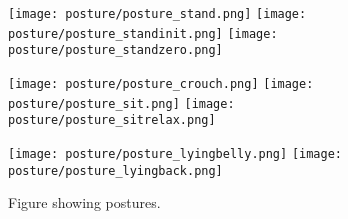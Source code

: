 \begin{figure}
\centerline{\texttt{[image: posture/posture\_stand.png]}
            \texttt{[image: posture/posture\_standinit.png]}
            \texttt{[image: posture/posture\_standzero.png]}
}
\vspace*{0.05in}
\centerline{\texttt{[image: posture/posture\_crouch.png]}
            \texttt{[image: posture/posture\_sit.png]}
            \texttt{[image: posture/posture\_sitrelax.png]}
}
\vspace*{0.05in}
\centerline{\texttt{[image: posture/posture\_lyingbelly.png]}
            \texttt{[image: posture/posture\_lyingback.png]}
}
\caption{Figure showing postures.}
\label{fig:nao_postures1}
\end{figure}
